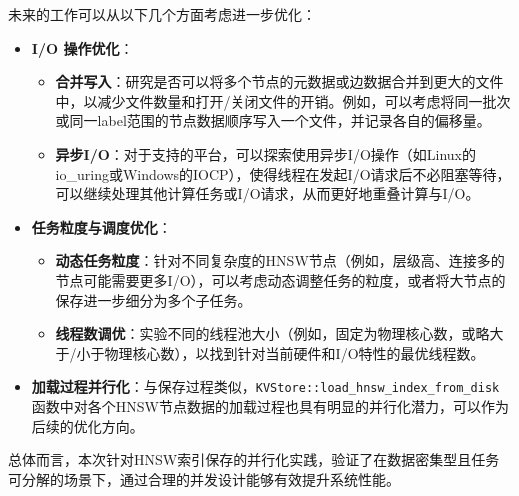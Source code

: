 \documentclass{ctexart} %
\begin{document}
未来的工作可以从以下几个方面考虑进一步优化：
\begin{itemize}
    \item \textbf{I/O 操作优化}：
    \begin{itemize}
        \item \textbf{合并写入}：研究是否可以将多个节点的元数据或边数据合并到更大的文件中，以减少文件数量和打开/关闭文件的开销。例如，可以考虑将同一批次或同一label范围的节点数据顺序写入一个文件，并记录各自的偏移量。
        \item \textbf{异步I/O}：对于支持的平台，可以探索使用异步I/O操作（如Linux的io\_uring或Windows的IOCP），使得线程在发起I/O请求后不必阻塞等待，可以继续处理其他计算任务或I/O请求，从而更好地重叠计算与I/O。
    \end{itemize}
    \item \textbf{任务粒度与调度优化}：
    \begin{itemize}
        \item \textbf{动态任务粒度}：针对不同复杂度的HNSW节点（例如，层级高、连接多的节点可能需要更多I/O），可以考虑动态调整任务的粒度，或者将大节点的保存进一步细分为多个子任务。
        \item \textbf{线程数调优}：实验不同的线程池大小（例如，固定为物理核心数，或略大于/小于物理核心数），以找到针对当前硬件和I/O特性的最优线程数。
    \end{itemize}
    \item \textbf{加载过程并行化}：与保存过程类似，\texttt{KVStore::load_hnsw_index_from_disk} 函数中对各个HNSW节点数据的加载过程也具有明显的并行化潜力，可以作为后续的优化方向。
\end{itemize}
总体而言，本次针对HNSW索引保存的并行化实践，验证了在数据密集型且任务可分解的场景下，通过合理的并发设计能够有效提升系统性能。
\end{document}

